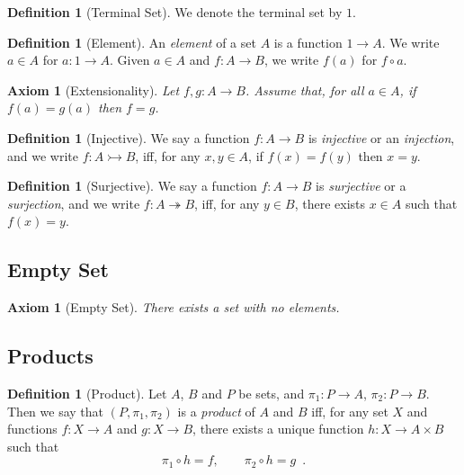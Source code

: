 \documentclass{book}
\newtheorem{ax}[prop]{Axiom}
\theoremstyle{definition}
\newtheorem{df}[prop]{Definition}
\begin{document}
\begin{df}[Terminal Set]
We denote the terminal set by $1$.
\end{df}

\begin{df}[Element]
An \emph{element} of a set $A$ is a function $1 \rightarrow A$. We write $a \in A$ for $a : 1 \rightarrow A$. Given $a \in A$ and $f : A \rightarrow B$, we write $f(a)$ for $f \circ a$.
\end{df}

\begin{ax}[Extensionality]
Let $f, g : A \rightarrow B$. Assume that, for all $a \in A$, if $f(a) = g(a)$ then $f = g$.
\end{ax}

\begin{df}[Injective]
We say a function $f : A \rightarrow B$ is \emph{injective} or an \emph{injection}, and we write $f : A \rightarrowtail B$, iff, for any $x,y \in A$, if $f(x) = f(y)$ then $x = y$.
\end{df}

\begin{df}[Surjective]
We say a function $f : A \rightarrow B$ is \emph{surjective} or a \emph{surjection}, and we write $f : A \twoheadrightarrow B$, iff, for any $y \in B$, there exists $x \in A$ such that $f(x) = y$.
\end{df}

\subsection{Empty Set}

\begin{ax}[Empty Set]
There exists a set with no elements.
\end{ax}

\subsection{Products}

\begin{df}[Product]
Let $A$, $B$ and $P$ be sets, and $\pi_1 : P \rightarrow A$, $\pi_2 : P \rightarrow B$. Then we say that $(P, \pi_1, \pi_2)$ is a \emph{product} of $A$ and $B$ iff, for any set $X$ and functions $f : X \rightarrow A$ and $g : X \rightarrow B$, there exists a unique function $h : X \rightarrow A \times B$ such that
\[ \pi_1 \circ h = f, \qquad \pi_2 \circ h = g \enspace . \]
\end{df}
\end{document}
